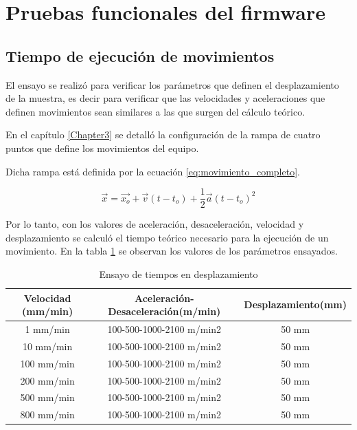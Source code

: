 \section{Pruebas funcionales del firmware}
\subsection{Tiempo de ejecución de movimientos}

El ensayo se realizó para verificar los parámetros que definen el desplazamiento de la muestra, es decir para verificar que las velocidades y aceleraciones que definen movimientos sean similares a las que surgen del cálculo teórico.

En el capítulo \ref{Chapter3} se detalló la configuración de la rampa de cuatro puntos que define los movimientos del equipo. 

Dicha rampa está definida por la ecuación \ref{eq:movimiento_completo}.

\begin{equation}
	\label{eq:movimiento_completo}
	\vec{x}=\vec{x_o}+\vec{v}(t-t_o)+\frac12 \vec {a} (t-t_o)^2
\end{equation}

Por lo tanto, con los valores de aceleración, desaceleración, velocidad y desplazamiento se calculó el tiempo teórico necesario para la ejecución de un movimiento.
En la tabla \ref{tab:ensayo_comandos} se observan los valores de los parámetros ensayados.

\begin{table}[h]
	\centering
	\caption[Ensayo de tiempo en desplazamientos]{Ensayo de tiempos en desplazamiento}
	\begin{tabular}{c c c }    
		\toprule
		\textbf{Velocidad (mm/min)}     & \textbf{Aceleración-Desaceleración(m/min)} & \textbf{Desplazamiento(mm)} \\
		\midrule
		1  mm/min	 & 	   100-500-1000-2100 m/min2     & 	50 mm 			 	\\		
		10  mm/min   & 	   100-500-1000-2100 m/min2 	& 	50 mm				\\
		100  mm/min  & 	   100-500-1000-2100 m/min2	    & 	50 mm 				\\
		200  mm/min	 & 	   100-500-1000-2100 m/min2	    & 	50 mm 			\\
		500  mm/min	 & 	   100-500-1000-2100 m/min2     & 	50 mm					\\
		800  mm/min	 & 	   100-500-1000-2100 m/min2     & 	50 mm					\\
		\bottomrule
		\hline
	\end{tabular}
	\label{tab:ensayo_comandos}
\end{table}

